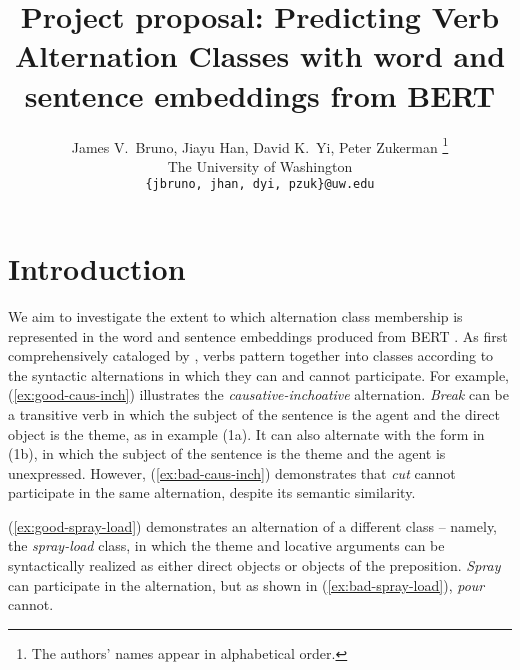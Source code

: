 \documentclass[11pt]{article}
\title{Project proposal: Predicting Verb Alternation Classes with word and sentence embeddings from BERT}
\author{James V.~Bruno, Jiayu Han, David K.~Yi, Peter Zukerman \thanks{ The authors' names appear in alphabetical order.}\\
The University of Washington\\
  \texttt{\{jbruno, jhan, dyi, pzuk\}@uw.edu}}
\begin{document}
\maketitle

\section{Introduction}

We aim to investigate the extent to which alternation class membership is represented in the word and sentence embeddings produced from BERT \citep{bertpaper}.  As first comprehensively cataloged by \citet{levin1993}, verbs pattern together into classes according to the syntactic alternations in which they can and cannot participate.  For example, (\ref{ex:good-caus-inch}) illustrates the \emph{causative-inchoative} alternation.  \emph{Break} can be a transitive verb in which the subject of the sentence is the agent and the direct object is the theme, as in example (1a).  It can also alternate with the form in (1b), in which the subject of the sentence is the theme and the agent is unexpressed. %
However, (\ref{ex:bad-caus-inch}) demonstrates that \emph{cut} cannot participate in the same alternation, despite its semantic similarity.

\begin{exe}
    \ex
        \label{ex:good-caus-inch}
        \begin{xlist}
        \end{xlist}

    \ex
        \label{ex:bad-caus-inch}
        \begin{xlist}
        \end{xlist}
\end{exe}

(\ref{ex:good-spray-load}) demonstrates an alternation of a different class -- namely, the \emph{spray-load} class, in which the theme and locative arguments can be syntactically realized as either direct objects or objects of the preposition.  \emph{Spray} can participate in the alternation, but as shown in (\ref{ex:bad-spray-load}), \emph{pour} cannot.

\begin{exe}
    \ex 
        \label{ex:good-spray-load}
        \begin{xlist}
        \end{xlist}

    \ex 
        \label{ex:bad-spray-load}
        \begin{xlist}
        \end{xlist}
\end{exe}
\end{document}
